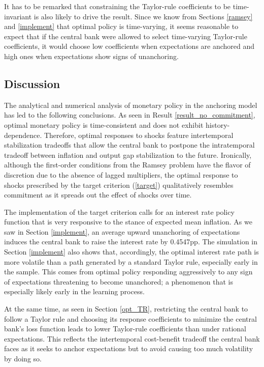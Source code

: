 \documentclass[11pt]{article}
\renewcommand{\[}{\begin{equation}}
\renewcommand{\]}{\end{equation}}
\begin{document}
It has to be remarked that constraining the Taylor-rule coefficients to be time-invariant is also likely to drive the result. Since we know from Sections \ref{ramsey} and \ref{implement} that optimal policy is time-varying, it seems reasonable to expect that if the central bank were allowed to select time-varying Taylor-rule coefficients, it would choose low coefficients when expectations are anchored and high ones when expectations show signs of unanchoring. 

\subsection{Discussion}\label{discussion_results}

The analytical and numerical analysis of monetary policy in the anchoring model has led to the following conclusions. As seen in Result \ref{result_no_commitment}, optimal monetary policy is time-consistent and does not exhibit history-dependence. Therefore, optimal responses to shocks feature intertemporal stabilization tradeoffs that allow the central bank to postpone the intratemporal tradeoff between inflation and output gap stabilization to the future. Ironically, although the first-order conditions from the Ramsey problem have the flavor of discretion due to the absence of lagged multipliers, the optimal response to shocks prescribed by the target criterion (\ref{target}) qualitatively resembles commitment as it spreads out the effect of shocks over time. 

The implementation of the target criterion calls for an interest rate policy function that is very responsive to the stance of expected mean inflation. As we saw in Section \ref{implement}, an average upward unanchoring of expectations induces the central bank to raise the interest rate by 0.4547pp. The simulation in Section \ref{implement} also shows that, accordingly, the optimal interest rate path is more volatile than a path generated by a standard Taylor rule, especially early in the sample. This comes from optimal policy responding aggressively to any sign of expectations threatening to become unanchored; a phenomenon that is especially likely early in the learning process.

At the same time, as seen in Section \ref{opt_TR}, restricting the central bank to follow a Taylor rule and choosing its response coefficients to minimize the central bank's loss function leads to lower Taylor-rule coefficients than under rational expectations. This reflects the intertemporal cost-benefit tradeoff the central bank faces as it seeks to anchor expectations but to avoid causing too much volatility by doing so.  
\end{document}
